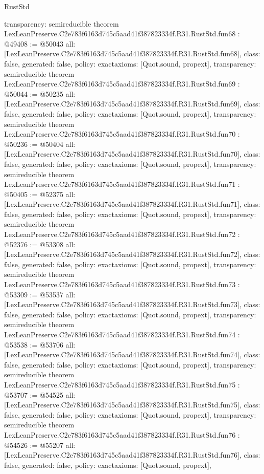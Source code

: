 \begin{lexlean}{RustStd}
\begin{coremodule}
{  transparency: semireducible
}
theorem LexLeanPreserve.C2e783f6163d745c5aad41f387823334f.R31.RustStd.fun68 : @49408 := @50043 {
  all: [LexLeanPreserve.C2e783f6163d745c5aad41f387823334f.R31.RustStd.fun68],
  class: false,
  generated: false,
  policy: exact{axioms: [Quot.sound, propext]},
  transparency: semireducible
}
theorem LexLeanPreserve.C2e783f6163d745c5aad41f387823334f.R31.RustStd.fun69 : @50044 := @50235 {
  all: [LexLeanPreserve.C2e783f6163d745c5aad41f387823334f.R31.RustStd.fun69],
  class: false,
  generated: false,
  policy: exact{axioms: [Quot.sound, propext]},
  transparency: semireducible
}
theorem LexLeanPreserve.C2e783f6163d745c5aad41f387823334f.R31.RustStd.fun70 : @50236 := @50404 {
  all: [LexLeanPreserve.C2e783f6163d745c5aad41f387823334f.R31.RustStd.fun70],
  class: false,
  generated: false,
  policy: exact{axioms: [Quot.sound, propext]},
  transparency: semireducible
}
theorem LexLeanPreserve.C2e783f6163d745c5aad41f387823334f.R31.RustStd.fun71 : @50405 := @52375 {
  all: [LexLeanPreserve.C2e783f6163d745c5aad41f387823334f.R31.RustStd.fun71],
  class: false,
  generated: false,
  policy: exact{axioms: [Quot.sound, propext]},
  transparency: semireducible
}
theorem LexLeanPreserve.C2e783f6163d745c5aad41f387823334f.R31.RustStd.fun72 : @52376 := @53308 {
  all: [LexLeanPreserve.C2e783f6163d745c5aad41f387823334f.R31.RustStd.fun72],
  class: false,
  generated: false,
  policy: exact{axioms: [Quot.sound, propext]},
  transparency: semireducible
}
theorem LexLeanPreserve.C2e783f6163d745c5aad41f387823334f.R31.RustStd.fun73 : @53309 := @53537 {
  all: [LexLeanPreserve.C2e783f6163d745c5aad41f387823334f.R31.RustStd.fun73],
  class: false,
  generated: false,
  policy: exact{axioms: [Quot.sound, propext]},
  transparency: semireducible
}
theorem LexLeanPreserve.C2e783f6163d745c5aad41f387823334f.R31.RustStd.fun74 : @53538 := @53706 {
  all: [LexLeanPreserve.C2e783f6163d745c5aad41f387823334f.R31.RustStd.fun74],
  class: false,
  generated: false,
  policy: exact{axioms: [Quot.sound, propext]},
  transparency: semireducible
}
theorem LexLeanPreserve.C2e783f6163d745c5aad41f387823334f.R31.RustStd.fun75 : @53707 := @54525 {
  all: [LexLeanPreserve.C2e783f6163d745c5aad41f387823334f.R31.RustStd.fun75],
  class: false,
  generated: false,
  policy: exact{axioms: [Quot.sound, propext]},
  transparency: semireducible
}
theorem LexLeanPreserve.C2e783f6163d745c5aad41f387823334f.R31.RustStd.fun76 : @54526 := @55207 {
  all: [LexLeanPreserve.C2e783f6163d745c5aad41f387823334f.R31.RustStd.fun76],
  class: false,
  generated: false,
  policy: exact{axioms: [Quot.sound, propext]},
}
\end{coremodule}
\end{lexlean}

